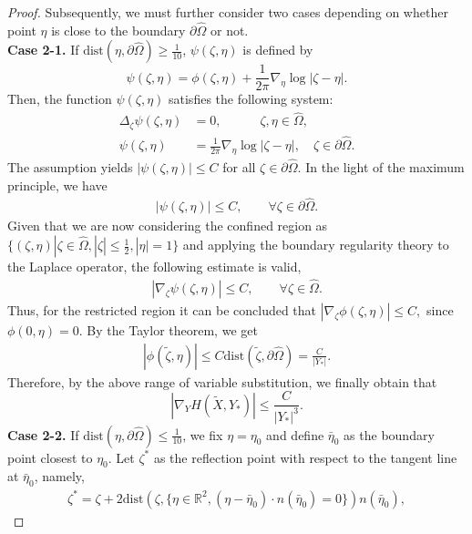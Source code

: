 \documentclass[11pt,reqno]{amsart}%
\theoremstyle{definition}
\theoremstyle{remark}
\begin{document}
\begin{proof}
Subsequently, we must further consider two cases depending on whether point $\eta$ is close to the boundary $\partial\hat{\Omega}$ or not.
\\
{\bf Case 2-1.} If $\text{dist}(\eta,\partial\hat{\Omega})\geq\frac{1}{10}$, $\psi(\zeta,\eta)$ is defined by
$$\psi(\zeta,\eta)=\phi(\zeta,\eta)+\frac{1}{2\pi}\nabla_{\eta}\log|\zeta-\eta|.$$
Then, the function $\psi(\zeta,\eta)$ satisfies the following system:
\begin{align}
\Delta_{\zeta}\psi(\zeta,\eta)&=0, \qquad \quad \zeta,\eta\in\hat{\Omega},\nonumber\\
\psi(\zeta,\eta)&=\frac{1}{2\pi}\nabla_{\eta}\log|\zeta-\eta|,\quad \zeta\in\partial\hat{\Omega}.\nonumber
\end{align}
The assumption yields $|\psi(\zeta,\eta)|\leq C$ for all $\zeta\in\partial\hat{\Omega}$. In the light of the maximum principle, we have
\begin{align}
|\psi(\zeta,\eta)|\leq C, \qquad \forall \zeta\in\partial\hat{\Omega}.\nonumber
\end{align}
Given that we are now considering the confined region as $\{(\zeta,\eta)|\zeta\in\hat{\Omega}, |\zeta|\leq\frac{1}{2},|\eta|=1\}$ and applying the boundary regularity theory to the Laplace operator, the following estimate is valid,
\begin{align}
|\nabla_{\zeta}\psi(\zeta,\eta)|\leq C,  \qquad \forall \zeta\in\hat{\Omega}.\nonumber
\end{align}
Thus, for the restricted region it can be concluded that $|\nabla_{\zeta}\phi(\zeta,\eta)|\leq C,$  since $\phi(0,\eta)=0$. By the Taylor theorem, we get
\begin{align}
|\phi(\tilde{\zeta},\eta)|\leq C \text{dist}(\tilde{\zeta},\partial\hat{\Omega})=\frac{C}{|Y_{*}|}.\nonumber
\end{align}
Therefore, by the above range of variable substitution, we finally obtain that
$$|\nabla_{Y}H(\tilde{X},Y_{*})|\leq\frac{C}{|Y_{*}|^{3}}.$$
%
{\bf Case 2-2.} If $\text{dist}(\eta,\partial\hat{\Omega})\leq\frac{1}{10}$, we fix $\eta=\eta_{0}$ and define $\bar{\eta}_{0}$ as the boundary point closest to $\eta_{0}$.
 Let $\zeta^{*}$ as the reflection point
with respect to the tangent line at $\bar{\eta}_{0}$, namely,
\begin{align}
\zeta^{*}=\zeta+2\text{dist}(\zeta,\{\eta\in \mathbb{R}^{2},(\eta-\bar{\eta}_{0})\cdot n(\bar{\eta}_{0})=0\})n(\bar{\eta}_{0}),\nonumber

\end{align}
\end{proof}
\end{document}
